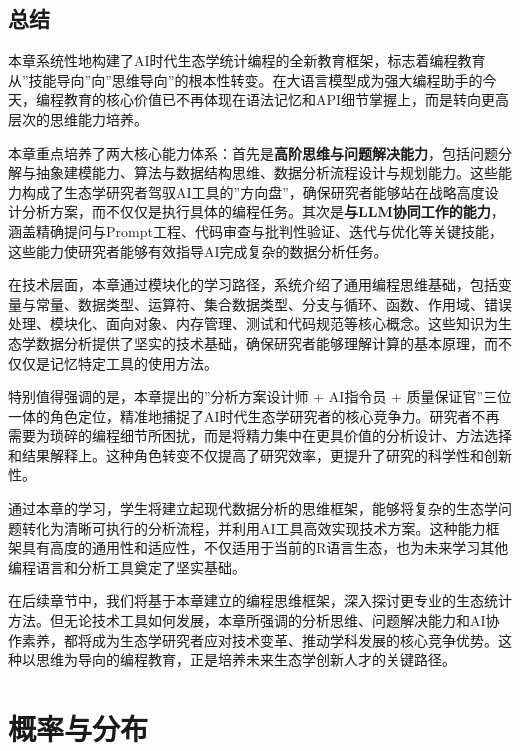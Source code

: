 \documentclass[
]{book}
\begin{document}
\hypertarget{ux603bux7ed3}{%
\section{总结}\label{ux603bux7ed3}}

本章系统性地构建了AI时代生态学统计编程的全新教育框架，标志着编程教育从''技能导向''向''思维导向''的根本性转变。在大语言模型成为强大编程助手的今天，编程教育的核心价值已不再体现在语法记忆和API细节掌握上，而是转向更高层次的思维能力培养。

本章重点培养了两大核心能力体系：首先是\textbf{高阶思维与问题解决能力}，包括问题分解与抽象建模能力、算法与数据结构思维、数据分析流程设计与规划能力。这些能力构成了生态学研究者驾驭AI工具的''方向盘''，确保研究者能够站在战略高度设计分析方案，而不仅仅是执行具体的编程任务。其次是\textbf{与LLM协同工作的能力}，涵盖精确提问与Prompt工程、代码审查与批判性验证、迭代与优化等关键技能，这些能力使研究者能够有效指导AI完成复杂的数据分析任务。

在技术层面，本章通过模块化的学习路径，系统介绍了通用编程思维基础，包括变量与常量、数据类型、运算符、集合数据类型、分支与循环、函数、作用域、错误处理、模块化、面向对象、内存管理、测试和代码规范等核心概念。这些知识为生态学数据分析提供了坚实的技术基础，确保研究者能够理解计算的基本原理，而不仅仅是记忆特定工具的使用方法。

特别值得强调的是，本章提出的''分析方案设计师 + AI指令员 + 质量保证官''三位一体的角色定位，精准地捕捉了AI时代生态学研究者的核心竞争力。研究者不再需要为琐碎的编程细节所困扰，而是将精力集中在更具价值的分析设计、方法选择和结果解释上。这种角色转变不仅提高了研究效率，更提升了研究的科学性和创新性。

通过本章的学习，学生将建立起现代数据分析的思维框架，能够将复杂的生态学问题转化为清晰可执行的分析流程，并利用AI工具高效实现技术方案。这种能力框架具有高度的通用性和适应性，不仅适用于当前的R语言生态，也为未来学习其他编程语言和分析工具奠定了坚实基础。

在后续章节中，我们将基于本章建立的编程思维框架，深入探讨更专业的生态统计方法。但无论技术工具如何发展，本章所强调的分析思维、问题解决能力和AI协作素养，都将成为生态学研究者应对技术变革、推动学科发展的核心竞争优势。这种以思维为导向的编程教育，正是培养未来生态学创新人才的关键路径。

\hypertarget{ux6982ux7387ux4e0eux5206ux5e03}{%
\chapter{概率与分布}\label{ux6982ux7387ux4e0eux5206ux5e03}}
\end{document}
